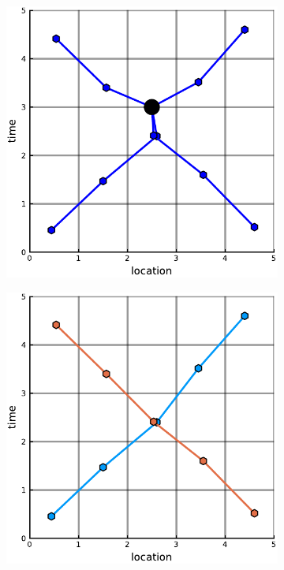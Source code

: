 \documentclass[12pt]{article}
\theoremstyle{definition}
\begin{document}
\begin{figure}
    \centering
    \begin{subfigure}[t]{0.3\textwidth}
      \includegraphics[width=\textwidth]{uturn-a.pdf}
      \caption{}
      \label{fig:u-turn-a}
    \end{subfigure}
    \begin{subfigure}[t]{0.3\textwidth}
      \includegraphics[width=\textwidth]{uturn-b.pdf}

\end{subfigure}
\end{figure}
\end{document}
